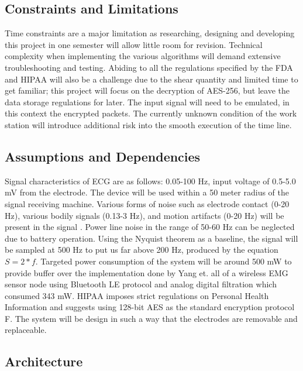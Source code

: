 \documentclass{article}
\begin{document}
\subsection{Constraints and Limitations}
Time constraints are a major limitation as researching, designing and developing this project in one semester will allow little room for revision. Technical complexity when implementing the various algorithms will demand extensive troubleshooting and testing. Abiding to all the regulations specified by the FDA and HIPAA will also be a challenge due to the shear quantity and limited time to get familiar; this project will focus on the decryption of AES-256, but leave the data storage regulations for later. The input signal will need to be emulated, in this context the encrypted packets. The currently unknown condition of the work station will introduce additional risk into the smooth execution of the time line. 
\subsection{Assumptions and Dependencies}
Signal characteristics of ECG are as follows: 0.05-100 Hz, input voltage of 0.5-5.0 mV \cite{adialogue} from the electrode. The device will be used within a 50 meter radius of the signal receiving machine. Various forms of noise such as electrode contact (0-20 Hz), various bodily signals (0.13-3 Hz), and motion artifacts (0-20 Hz) will be present in the signal \cite{ecgfiltering}. Power line noise in the range of 50-60 Hz can be neglected due to battery operation. Using the Nyquist theorem as a baseline, the signal will be sampled at 500 Hz to put us far above 200 Hz, produced by the equation $S = 2 * f$. Targeted power consumption of the system will be around 500 mW to provide buffer over the implementation done by Yang et. all \cite{yang} of a wireless EMG sensor node using Bluetooth LE protocol and analog digital filtration which consumed 343 mW. HIPAA imposes strict regulations on Personal Health Information and suggests using 128-bit AES as the standard encryption protocol F\cite{sprinto}. The system will be design in such a way that the electrodes are removable and replaceable. 

\newpage
\subsection{Architecture}
\end{document}
